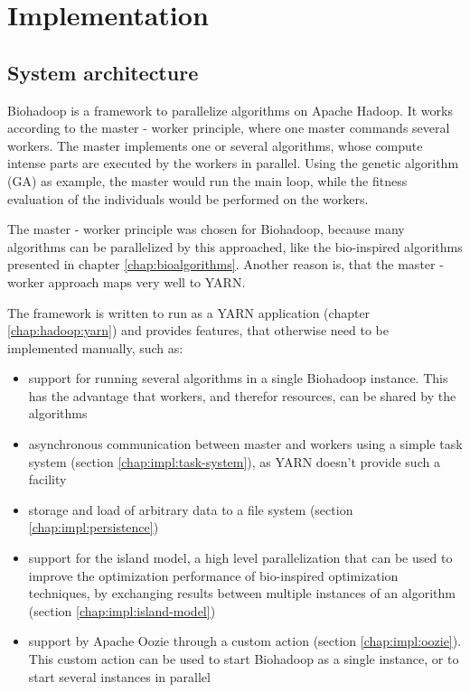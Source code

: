 \chapter{Implementation}
\label{chap:impl}

\section{System architecture}
\label{chap:impl:system-architecture}
  Biohadoop is a framework to parallelize algorithms on Apache Hadoop. It works according to the master - worker principle, where one master commands several workers. The master implements one or several algorithms, whose compute intense parts are executed by the workers in parallel. Using the genetic algorithm (GA) as example, the master would run the main loop, while the fitness evaluation of the individuals would be performed on the workers.
  
  The master - worker principle was chosen for Biohadoop, because many algorithms can be parallelized by this approached, like the bio-inspired algorithms presented in chapter \ref{chap:bioalgorithms}. Another reason is, that the master - worker approach maps very well to YARN.
  
  The framework is written to run as a YARN application (chapter \ref{chap:hadoop:yarn}) and provides features, that otherwise need to be implemented manually, such as:
  
  \begin{itemize}
    \item support for running several algorithms in a single Biohadoop instance. This has the advantage that workers, and therefor resources, can be shared by the algorithms
    \item asynchronous communication between master and workers using a simple task system (section \ref{chap:impl:task-system}), as YARN doesn't provide such a facility
    \item storage and load of arbitrary data to a file system (section \ref{chap:impl:persistence})
    \item support for the island model, a high level parallelization that can be used to improve the optimization performance of bio-inspired optimization techniques, by exchanging results between multiple instances of an algorithm (section \ref{chap:impl:island-model})
    \item support by Apache Oozie through a custom action (section \ref{chap:impl:oozie}). This custom action can be used to start Biohadoop as a single instance, or to start several instances in parallel
  \end{itemize}
  
